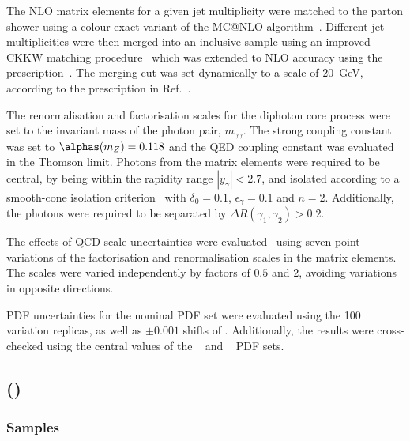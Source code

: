The NLO matrix elements for a given jet multiplicity were matched to the parton
shower using a colour-exact variant of the MC@NLO algorithm~\cite{Hoeche:2011fd}. 
Different jet multiplicities were then merged
into an inclusive sample using an improved CKKW matching
procedure~\cite{Catani:2001cc,Hoeche:2009rj} which was extended to NLO
accuracy using the \MEPSatNLO prescription~\cite{Hoeche:2012yf}.
The merging cut was set dynamically to a scale of \SI{20}{\GeV},
according to the prescription in Ref.~\cite{Siegert:2016bre}.

The renormalisation and factorisation scales for the diphoton core process
were set to the invariant mass of the photon pair, $m_{\gamma\gamma}$.
The strong coupling constant was set to $\alphas (m_Z)= 0.118$ and the QED coupling
constant was evaluated in the Thomson limit. Photons from the matrix elements were required to be central, 
by being within the rapidity range $|y_{\gamma}|<2.7$, and isolated according to a smooth-cone isolation 
criterion~\cite{Frixione:1998jh} with $\delta_0=0.1$, $\epsilon_{\gamma}=0.1$ and $n=2$. 
Additionally, the photons were required to be separated by $\Delta R(\gamma_1,\gamma_2) > 0.2$.


The effects of QCD scale uncertainties were evaluated~\cite{Bothmann:2016nao} using
seven-point variations of the factorisation and renormalisation scales in the matrix elements.
The scales were varied independently by factors of $0.5$ and $2$, avoiding variations in opposite directions.

PDF uncertainties for the nominal PDF set were
evaluated using the 100 variation replicas, as well as $\pm 0.001$ shifts
of \alphas. Additionally, the results were cross-checked using the central values of the 
\CT[14nnlo]~\cite{Dulat:2015mca} and \MMHT[nnlo]~\cite{Harland-Lang:2014zoa} 
PDF sets.


\subsection[Sherpa (MEPS@NLO)]{\SHERPA (\MEPSatNLO)}

\subsubsection*{Samples}

